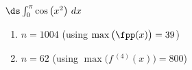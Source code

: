 {$\ds \int_{0}^{\pi} \cos \big(x^2\big) \ dx$}
{\begin{enumerate}
\item		$n=1004$ (using $\max\big(\fpp(x)\big)=39$)
\item		$n=62$	(using $\max\big(f\,^{(4)}(x)\big)=800$)
\end{enumerate}
}